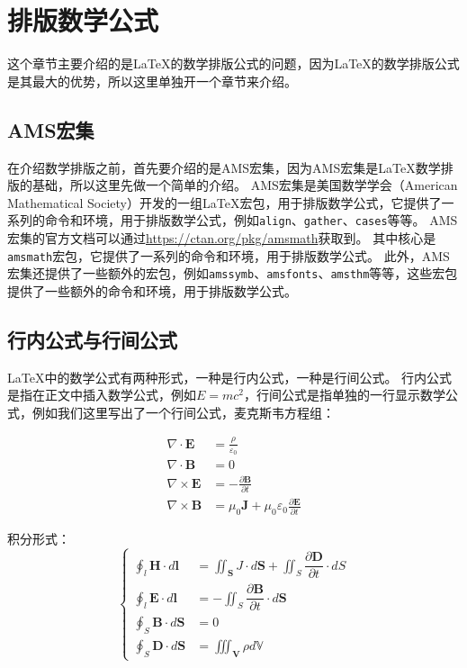 \section{排版数学公式}
这个章节主要介绍的是\LaTeX{}的数学排版公式的问题，因为\LaTeX{}的数学排版公式是其最大的优势，所以这里单独开一个章节来介绍。

\subsection{AMS宏集}
在介绍数学排版之前，首先要介绍的是AMS宏集，因为AMS宏集是\LaTeX{}数学排版的基础，所以这里先做一个简单的介绍。
AMS宏集是美国数学学会（American Mathematical Society）开发的一组\LaTeX{}宏包，用于排版数学公式，它提供了一系列的命令和环境，用于排版数学公式，例如\texttt{align}、\texttt{gather}、\texttt{cases}等等。
AMS宏集的官方文档可以通过\href{https://ctan.org/pkg/amsmath}{https://ctan.org/pkg/amsmath}获取到。
其中核心是\texttt{amsmath}宏包，它提供了一系列的命令和环境，用于排版数学公式。
此外，AMS宏集还提供了一些额外的宏包，例如\texttt{amssymb}、\texttt{amsfonts}、\texttt{amsthm}等等，这些宏包提供了一些额外的命令和环境，用于排版数学公式。
\subsection{行内公式与行间公式}
\LaTeX{}中的数学公式有两种形式，一种是行内公式，一种是行间公式。
行内公式是指在正文中插入数学公式，例如$E=mc^2$，行间公式是指单独的一行显示数学公式，例如我们这里写出了一个行间公式，麦克斯韦方程组：

\begin{equation}
    \begin{aligned}
        \nabla \cdot \mathbf{E} & = \frac{\rho}{\varepsilon_{0}} \\
        \nabla \cdot \mathbf{B} & = 0 \\
        \nabla \times \mathbf{E} & =-\frac{\partial \mathbf{B}}{\partial t} \\
        \nabla \times \mathbf{B} & = \mu_{0} \mathbf{J}+\mu_{0} \varepsilon_{0} \frac{\partial \mathbf{E}}{\partial t}
    \end{aligned}
\end{equation}

积分形式：
\begin{equation}
    \begin{cases}
        \displaystyle\oint_{l}\mathbf{H}\cdot{d}\mathbf{l}&=\displaystyle\iint_\mathbf{S}J\cdot{d}\mathbf{S}+\displaystyle\iint_{S}\dfrac{\partial\mathbf{D}}{\partial{t}}\cdot{dS}\\
        \displaystyle\oint_{l}\mathbf{E}\cdot{d}\mathbf{l}&=-\displaystyle\iint_{S}\dfrac{\partial\mathbf{B}}{\partial{t}}\cdot{d}\mathbf{S}\\
        \displaystyle\oint_{S}\mathbf{B}\cdot{d}\mathbf{S}&=0\\
        \displaystyle\oint_{S}\mathbf{D}\cdot{d}\mathbf{S}&=\displaystyle\iiint_\mathbf{V}\rho{d}\mathbb{V}
    \end{cases}
\end{equation}

